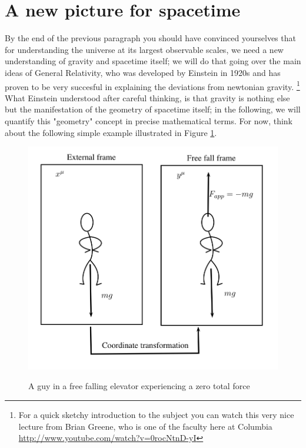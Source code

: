 \documentclass[11pt, a4paper,oneside,openright]{book}
\numberwithin{equation}{section}
\begin{document}
\section{A new picture for spacetime}
By the end of the previous paragraph you should have convinced yourselves that for understanding the universe at its largest observable scales, we need a new understanding of gravity and spacetime itself; we will do that going over the main ideas of General Relativity, who was developed by Einstein in 1920s and has proven to be very succesful in explaining the deviations from newtonian gravity. \footnote{For a quick sketchy introduction to the subject you can watch this very nice lecture from Brian Greene, who is one of the faculty here at Columbia \url{http://www.youtube.com/watch?v=0rocNtnD-yI}} What Einstein understood after careful thinking, is that gravity is nothing else but the manifestation of the geometry of spacetime itself; in the following, we will quantify this "geometry" concept in precise mathematical terms. For now, think about the following simple example illustrated in Figure \ref{freefall}.  
\begin{figure}
\begin{center}
\includegraphics[scale=0.7]{Draw/Free_fall.png}
\label{}
\end{center}
\caption{A guy in a free falling elevator experiencing a zero total force}
\label{freefall}
\end{figure}
\end{document}
